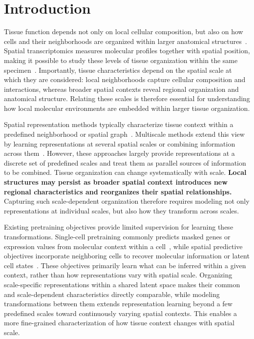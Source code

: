 














\section{Introduction}
\label{sec:introduction}

Tissue function depends not only on local cellular composition, but also on how cells and their neighborhoods are organized within larger anatomical structures~\citep{schurch2020coordinated}. Spatial transcriptomics measures molecular profiles together with spatial position, making it possible to study these levels of tissue organization within the same specimen~\citep{chen2022mosta,pan2026hesta}. Importantly, tissue characteristics depend on the spatial scale at which they are considered: local neighborhoods capture cellular composition and interactions, whereas broader spatial contexts reveal regional organization and anatomical structure. Relating these scales is therefore essential for understanding how local molecular environments are embedded within larger tissue organization.

Spatial representation methods typically characterize tissue context within a predefined neighborhood or spatial graph~\citep{long2023graphst,singhal2024banksy}. Multiscale methods extend this view by learning representations at several spatial scales or combining information across them~\citep{yuan2024mender,zhao2025stofm,lin2024stalign}. However, these approaches largely provide representations at a discrete set of predefined scales and treat them as parallel sources of information to be combined. Tissue organization can change systematically with scale. \textbf{Local structures may persist as broader spatial context introduces new regional characteristics and reorganizes their spatial relationships.} Capturing such scale-dependent organization therefore requires modeling not only representations at individual scales, but also how they transform across scales.

Existing pretraining objectives provide limited supervision for learning these transformations. Single-cell pretraining commonly predicts masked genes or expression values from molecular context within a cell~\citep{theodoris2023geneformer,cui2024scgpt}, while spatial predictive objectives incorporate neighboring cells to recover molecular information or latent cell states~\citep{zhao2025stofm,liu2026cellworld}. These objectives primarily learn what can be inferred within a given context, rather than how representations vary with spatial scale. Organizing scale-specific representations within a shared latent space makes their common and scale-dependent characteristics directly comparable, while modeling transformations between them extends representation learning beyond a few predefined scales toward continuously varying spatial contexts. This enables a more fine-grained characterization of how tissue context changes with spatial scale.


